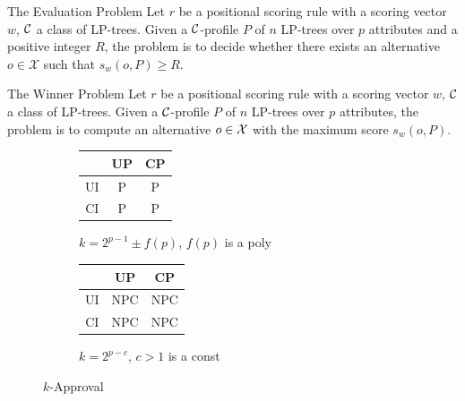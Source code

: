 {
  \begin{block}{The Evaluation Problem}
		Let $r$ be a positional scoring rule with a scoring 
		vector $w$, $\mathcal{C}$ a class of LP-trees.
		Given a $\mathcal{C}$-profile $P$ of $n$ LP-trees over $p$ attributes and a 
		positive integer $R$,
		the  problem is to decide whether 
		there exists an alternative $o \in \mathcal{X}$ such that $s_{{w}}(o,P)
    \geq R$.
  \end{block}

	\vspace{0.5cm}

  \begin{block}{The Winner Problem}
		Let $r$ be a positional scoring rule with a scoring 
		vector $w$, $\mathcal{C}$ a class of LP-trees.
		Given a $\mathcal{C}$-profile $P$ of $n$ LP-trees over $p$ attributes,
		the  problem is to compute an alternative
		$o \in \mathcal{X}$ with the maximum score $s_w(o,P)$.
  \end{block}
}

{
	\begin{figure}
		\centering
    \begin{subfigure}[b]{0.45\textwidth}
			\centering
		  \begin{tabular}[0.45\textwidth]{ | c | c | c | }
		    \hline
		      & UP & CP \\
		    \hline
		    UI & P & P \\
		    \hline
		    CI & P & P \\
		    \hline
		  \end{tabular}
			\caption{\footnotesize $k=2^{p-1} \pm f(p)$, $f(p)$ is a poly}
		\end{subfigure}
    \begin{subfigure}[b]{0.45\textwidth}
			\centering
		  \begin{tabular}[0.45\textwidth]{ | c | c | c | }
		    \hline
		      & UP & CP \\
		    \hline
		    UI & NPC & NPC \\
		    \hline
		    CI & NPC & NPC \\
		    \hline
		  \end{tabular}
			\caption{\footnotesize $k=2^{p-c}$, $c>1$ is a const}
		\end{subfigure}
		\caption{$k$-Approval}
	\end{figure}
}

